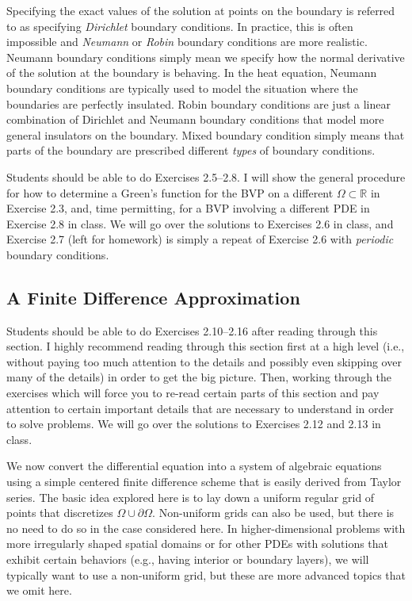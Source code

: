 \documentclass{amsart}
\theoremstyle{plain}
\theoremstyle{definition}
\theoremstyle{remark}
\theoremstyle{definition}
\numberwithin{equation}{section}
\numberwithin{equation}{section}
\begin{document}
Specifying the exact values of the solution at points on the boundary is referred to as specifying {\em Dirichlet} boundary conditions. 
In practice, this is often impossible and {\em Neumann} or {\em Robin} boundary conditions are more realistic.
Neumann boundary conditions simply mean we specify how the normal derivative of the solution at the boundary is behaving.
In the heat equation, Neumann boundary conditions are typically used to model the situation where the boundaries are perfectly insulated. 
Robin boundary conditions are just a linear combination of Dirichlet and Neumann boundary conditions that model more general insulators on the boundary. 
Mixed boundary condition simply means that parts of the boundary are prescribed different {\em types} of boundary conditions.

Students should be able to do Exercises 2.5--2.8. 
I will show the general procedure for how to determine a Green's function for the BVP on a different $\Omega\subset\mathbb{R}$ in Exercise 2.3, and, time permitting, for a BVP involving a different PDE in Exercise 2.8 in class.
We will go over the solutions to Exercises 2.6 in class, and Exercise 2.7 (left for homework) is simply a repeat of Exercise 2.6 with {\em periodic} boundary conditions. 


\subsection{A Finite Difference Approximation}

Students should be able to do Exercises 2.10--2.16 after reading through this section. 
I highly recommend reading through this section first at a high level (i.e., without paying too much attention to the details and possibly even skipping over many of the details) in order to get the big picture. 
Then, working through the exercises which will force you to re-read certain parts of this section and pay attention to certain important details that are necessary to understand in order to solve problems. 
We will go over the solutions to Exercises 2.12 and 2.13 in class. 

We now convert the differential equation into a system of algebraic equations using a simple centered finite difference scheme that is easily derived from Taylor series.
The basic idea explored here is to lay down a uniform regular grid of points that discretizes $\Omega\cup\partial\Omega$.
Non-uniform grids can also be used, but there is no need to do so in the case considered here.
In higher-dimensional problems with more irregularly shaped spatial domains or for other PDEs with solutions that exhibit certain behaviors (e.g., having interior or boundary layers), we will typically want to use a non-uniform grid, but these are more advanced topics that we omit here.
\end{document}
